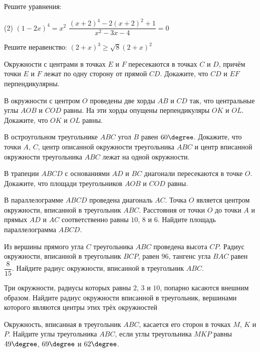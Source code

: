 %
%

\begin{class}[number=1]
	\begin{listofex}
		\item Решите уравнения:
		\begin{tasks}(2)
			\task \( (1-2x)^4=x^2 \)
			\task \( \dfrac{(x+2)^4-2(x+2)^2+1}{x^2-3x-4}=0 \)
		\end{tasks}
		\item Решите неравенство: \( (2+x)^3\ge\sqrt{8}(2+x)^2 \)
		\item Окружности с центрами в точках \( E \) и \( F \) пересекаются в точках \( C \) и \( D \),	причём точки \( E \) и \( F \) лежат по одну сторону от прямой \( CD \). Докажите, что \( CD \) и \( EF \) перпендикулярны.      
		\item В окружности с центром \( O \) проведены две хорды \( AB \) и \( CD \) так, что центральные углы \( AOB \) и \( COD \) равны. На эти хорды опущены перпендикуляры \( OK \) и \( OL \). Докажите, что \( OK \) и \( OL \) равны.
		\item В остроугольном треугольнике \( ABC \) угол \( B \) равен \( 60\degree \). Докажите, что точки \( A \), \( C \), центр описанной окружности треугольника \( ABC \) и центр вписанной окружности треугольника \( ABC \) лежат на одной окружности.
		\item В трапеции \( ABCD \) с основаниями \( AD \) и \( BC \) диагонали пересекаются в точке \( O \). Докажите, что площади треугольников \( AOB \) и \( COD \) равны.
		\item В параллелограмме \( ABCD \) проведена диагональ \( AC \). Точка \( O \) является центром окружности, вписанной в треугольник \( ABC \). Расстояния от точки \( O \) до точки \( A \) и прямых \( AD \) и \( AC \) соответственно равны \( 10 \), \( 8 \) и \( 6 \). Найдите площадь параллелограмма \( ABCD \).
		\item Из вершины прямого угла \( C \) треугольника \( ABC \) проведена высота \( CP \). Радиус окружности, вписанной в треугольник \( BCP \), равен \( 96 \), тангенс угла	\( BAC \) равен \( \dfrac{8}{15} \). Найдите радиус окружности, вписанной в треугольник \( ABC \).
		\item Три окружности, радиусы которых равны \( 2 \), \( 3 \) и \( 10 \), попарно касаются внешним образом. Найдите радиус окружности вписанной в треугольник, вершинами которого являются центры этих трёх окружностей
		\item Окружность, вписанная в треугольник \( ABC \), касается его сторон в точках \( M \), \( K \) и \( P \). Найдите углы треугольника \( ABC \), если углы треугольника \( MKP \) равны \( 49\degree \), \( 69\degree \) и \( 62\degree \).
	\end{listofex}
\end{class}

